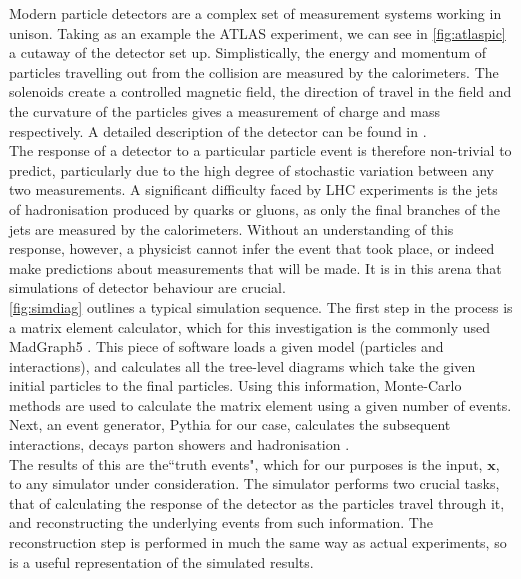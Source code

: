 \documentclass{article}
\begin{document}
Modern particle detectors are a complex set of measurement systems working in unison. Taking as an example the ATLAS experiment, we can see in \cref{fig:atlaspic} a cutaway of the detector set up. Simplistically, the energy and momentum of particles travelling out from the collision are measured by the calorimeters. The solenoids create a controlled magnetic field, the direction of travel in the field and the curvature of the particles gives a measurement of charge and mass respectively. A detailed description of the detector can be found in \cite{atlasprop}.
\\


The response of a detector to a particular particle event is therefore non-trivial to predict, particularly due to the high degree of stochastic variation between any two measurements. A significant difficulty faced by LHC experiments is the jets of hadronisation produced by quarks or gluons, as only the final branches of the jets are measured by the calorimeters. Without an understanding of this response, however, a physicist cannot infer the event that took place, or indeed make predictions about measurements that will be made. It is in this arena that simulations of detector behaviour are crucial. \\

\cref{fig:simdiag} outlines a typical simulation sequence. The first step in the process is a matrix element calculator, which for this investigation is the commonly used MadGraph5 \cite{Alwall2014}. This piece of software loads a given model (particles and interactions), and calculates all the tree-level diagrams which take the given initial particles to the final particles. Using this information, Monte-Carlo methods are used to calculate the matrix element using a given number of events. Next, an event generator, Pythia for our case, calculates the subsequent interactions, decays parton showers and hadronisation \cite{Gieseke2012}.\\

The results of this are the``truth events", which for our purposes is the input, $\mathbf{x}$, to any simulator under consideration. The simulator performs two crucial tasks, that of calculating the response of the detector as the particles travel through it, and reconstructing the underlying events from such information. The reconstruction step is performed in much the same way as actual experiments, so is a useful representation of the simulated results.        
\end{document}
